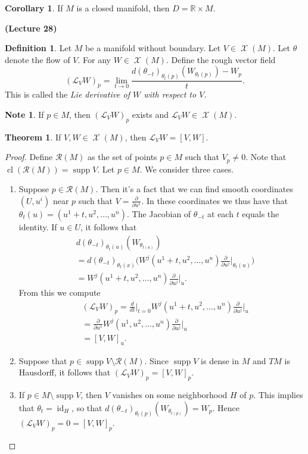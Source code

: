 \documentclass[10pt,letterpaper,cm]{nupset}
\theoremstyle{definition}
\newtheorem*{definition}{Definition}
\newtheorem{theorem}{Theorem}
\newtheorem{corollary}{Corollary}
\newtheorem*{note}{Note}
\newcommand{\R}{\mathbb R}
\newcommand{\1}{\mathbf{1}}
\newcommand{\0}{\vec 0}
\DeclareMathOperator{\id}{id}
\DeclareMathOperator{\supp}{supp}
\DeclareMathOperator{\cl}{cl}
\DeclareMathOperator{\vf}{\mathscr{X}}
\begin{document}
\begin{corollary}
If $M$ is a closed manifold, then $D = \R \times M$.
\end{corollary}

\begin{center}
{\textbf{(Lecture 28)}} 
\end{center}

\begin{definition}
Let $M$ be a manifold without boundary. Let $V\in \vf(M)$. Let $\theta$ denote the flow of $V$. For any $W\in \vf(M)$. Define the rough vector field $$ (\mathcal{L}_VW)_p  = \lim_{t\to 0}\frac{d(\theta_{-t})_{\theta_t(p)}(W_{\theta_{t}(p)})-W_p }{t}.$$ This is called the \textit{Lie derivative of $W$ with respect to $V$.}
\end{definition}
\begin{note}
If $p\in M$, then $(\mathcal{L}_VW)_p$ exists and $\mathcal{L}_VW \in \vf(M)$. 
\end{note}

\begin{theorem}
If $V, W\in \vf(M)$, then $\mathcal{L}_VW = [V, W]$.
\end{theorem}
\begin{proof}
Define $\mathcal{R}(M)$ as the set of points $p\in M$ such that $V_p\ne 0$. Note that $\cl(\mathcal{R}(M)) = \supp V$. Let $p\in M$. We consider three cases.
\begin{enumerate}
\item Suppose $p\in \mathcal{R}(M)$. Then it's a fact that we can find smooth coordinates $(U, u^i)$ near $p$ such that $V= \frac{\partial}{\partial{u^1}}$. In these coordinates we thus have that $\theta_t(u) = (u^1 +t, u^2, \ldots, u^n)$. The Jacobian of ${\theta_{-t}}$ at each $t$ equals the identity. If $u\in U$, it follows that
\begin{align*}
& d(\theta_{-t})_{\theta_t(u)}(W_{\theta_{t(u)}})
\\ & = d(\theta_{-t})_{\theta_t(x)} \big(W^j(u^1 + t, u^2, \ldots, u^n)\frac{\partial}{\partial{u^j}}\rvert_{\theta_t(u)}\big )
\\ & = W^j(u^1 + t, u^2, \ldots, u^n)\frac{\partial}{\partial{u^j}}\rvert_{u}.
\end{align*}
From this we compute
\begin{align*}
& (\mathcal{L}_VW)_p= \frac{d}{dt}\rvert_{t=0} W^j(u^1 + t, u^2, \ldots, u^n)\frac{\partial}{\partial{u^j}}\rvert_{u}
\\ & = \frac{\partial}{\partial{u^1}}W^j(u^1 , u^2, \ldots, u^n)\frac{\partial}{\partial{u^j}}\rvert_{u}
\\ & = [V, W]_u
.\end{align*}
\item Suppose that $p\in \supp V \setminus \mathcal{R}(M)$. Since $\supp V$ is dense in $M$ and $TM$ is Hausdorff, it follows that $(\mathcal{L}_VW)_p = [V, W]_p$.
\item If $p\in  M\setminus \supp V$, then $V$ vanishes on some neighborhood $H$ of $p$. This implies that $\theta_t = \id_H$, so that $d(\theta_{-t})_{\theta_t(p)}(W_{\theta_{t(p)}}) = W_p$. Hence $(\mathcal{L}_VW)_p =0 = [V, W]_p$.
\end{enumerate}
\end{proof}
\end{document}
